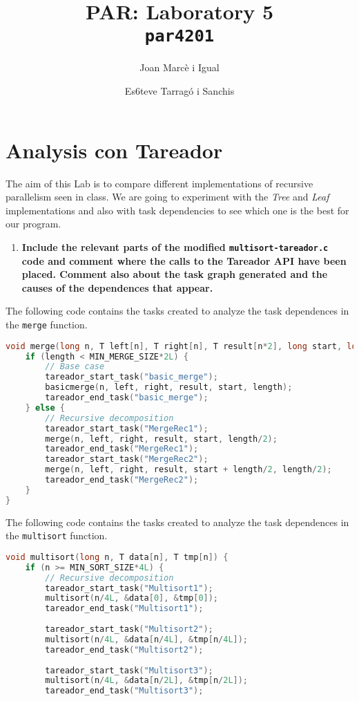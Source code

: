 \documentclass[a4paper]{article}
\title{PAR: Laboratory 5 \\
		\texttt{\large par4201}}
\author{Joan Marcè i Igual \and Es6teve Tarragó i Sanchis}
\newenvironment{questionenum}{%
\setlist[enumerate]{resume}
\restartlist{enumerate}
\newcommand{\question}[1]{
\begin{enumerate}
	\item\bfseries ##1
\end{enumerate}
}}{%
}
\begin{document}
\maketitle
\tableofcontents

\section{Analysis con Tareador}
The aim of this Lab is to compare different implementations of recursive parallelism seen in class. We are going to experiment with the \emph{Tree} and \emph{Leaf} implementations and also with task dependencies to see which one is the best for our program.

\begin{questionenum}
	\question{Include the relevant parts of the modified \texttt{multisort-tareador.c} code and comment where the calls to the Tareador API have been placed. Comment also about the task graph generated and the causes of the dependences that appear.}
	
	The following code contains the tasks created to analyze the task dependences in the \verb|merge| function.
\begin{lstlisting}[language=C]
void merge(long n, T left[n], T right[n], T result[n*2], long start, long length) {
	if (length < MIN_MERGE_SIZE*2L) {
		// Base case
		tareador_start_task("basic_merge");
		basicmerge(n, left, right, result, start, length);
		tareador_end_task("basic_merge");
	} else {
		// Recursive decomposition
		tareador_start_task("MergeRec1");
		merge(n, left, right, result, start, length/2);
		tareador_end_task("MergeRec1");
		tareador_start_task("MergeRec2");
		merge(n, left, right, result, start + length/2, length/2);
		tareador_end_task("MergeRec2");
	}
}
\end{lstlisting}

	The following code contains the tasks created to analyze the task dependences in the \verb|multisort| function.
	
\begin{lstlisting}[language=C]
void multisort(long n, T data[n], T tmp[n]) {
	if (n >= MIN_SORT_SIZE*4L) {
		// Recursive decomposition
		tareador_start_task("Multisort1");
		multisort(n/4L, &data[0], &tmp[0]);
		tareador_end_task("Multisort1");
		
		tareador_start_task("Multisort2");
		multisort(n/4L, &data[n/4L], &tmp[n/4L]);
		tareador_end_task("Multisort2");
		
		tareador_start_task("Multisort3");
		multisort(n/4L, &data[n/2L], &tmp[n/2L]);
		tareador_end_task("Multisort3");
		

\end{lstlisting}
\end{questionenum}
\end{document}
